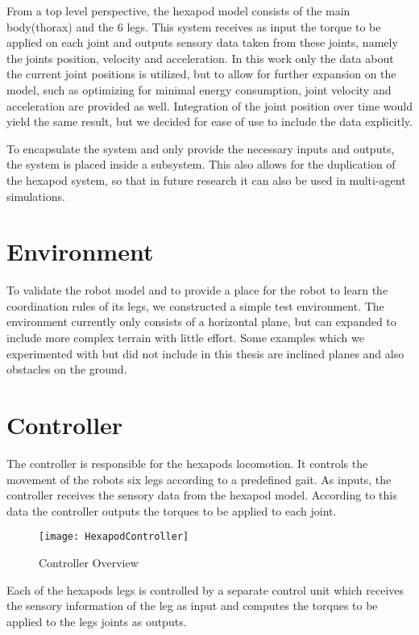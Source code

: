 From a top level perspective, the hexapod model consists of the main body(thorax) and the 6 legs.
This system receives as input the torque to be applied on each joint and outputs sensory data taken from these joints, namely the joints position, velocity and acceleration.
In this work only the data about the current joint positions is utilized, but to allow for further expansion on the model, such as optimizing for minimal energy consumption, joint velocity and acceleration are provided as well.
Integration of the joint position over time would yield the same result, but we decided for ease of use to include the data explicitly.

To encapsulate the system and only provide the necessary inputs and outputs, the system is placed inside a subsystem.
This also allows for the duplication of the hexapod system, so that in future research it can also be used in multi-agent simulations.

\section{Environment}
To validate the robot model and to provide a place for the robot to learn the coordination rules of its legs, we constructed a simple test environment.
The environment currently only consists of a horizontal plane, but can expanded to include more complex terrain with little effort.
Some examples which we experimented with but did not include in this thesis are inclined planes and also obstacles on the ground.

\section{Controller}
The controller is responsible for the hexapods locomotion.
It controls the movement of the robots six legs according to a predefined gait.
As inputs, the controller receives the sensory data from the hexapod model.
According to this data the controller outputs the torques to be applied to each joint.

\begin{figure}
	\centerline{\texttt{[image: HexapodController]}}
	\caption{Controller Overview}
	\label{Controller Overview}
\end{figure}
Each of the hexapods legs is controlled by a separate control unit which receives the sensory information of the leg as input and computes the torques to be applied to the legs joints as outputs.





